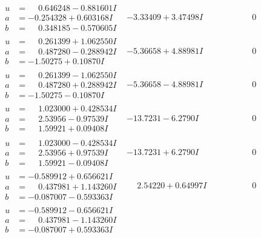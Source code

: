 \documentclass[1p]{elsarticle_modified}
\theoremstyle{definition}
\begin{document}
$$\begin{array}{c|c|c}
\begin{aligned}
u &= \phantom{-}0.646248 - 0.881601 I \\
a &= -0.254328 + 0.603168 I \\
b &= \phantom{-}0.348185 - 0.570605 I\end{aligned}
 & -3.33409 + 3.47498 I & \phantom{-0.000000 } 0 \\ \hline\begin{aligned}
u &= \phantom{-}0.261399 + 1.062550 I \\
a &= \phantom{-}0.487280 - 0.288942 I \\
b &= -1.50275 + 0.10870 I\end{aligned}
 & -5.36658 + 4.88981 I & \phantom{-0.000000 } 0 \\ \hline\begin{aligned}
u &= \phantom{-}0.261399 - 1.062550 I \\
a &= \phantom{-}0.487280 + 0.288942 I \\
b &= -1.50275 - 0.10870 I\end{aligned}
 & -5.36658 - 4.88981 I & \phantom{-0.000000 } 0 \\ \hline\begin{aligned}
u &= \phantom{-}1.023000 + 0.428534 I \\
a &= \phantom{-}2.53956 - 0.97539 I \\
b &= \phantom{-}1.59921 + 0.09408 I\end{aligned}
 & -13.7231 - 6.2790 I & \phantom{-0.000000 } 0 \\ \hline\begin{aligned}
u &= \phantom{-}1.023000 - 0.428534 I \\
a &= \phantom{-}2.53956 + 0.97539 I \\
b &= \phantom{-}1.59921 - 0.09408 I\end{aligned}
 & -13.7231 + 6.2790 I & \phantom{-0.000000 } 0 \\ \hline\begin{aligned}
u &= -0.589912 + 0.656621 I \\
a &= \phantom{-}0.437981 + 1.143260 I \\
b &= -0.087007 - 0.593363 I\end{aligned}
 & \phantom{-}2.54220 + 0.64997 I & \phantom{-0.000000 } 0 \\ \hline\begin{aligned}
u &= -0.589912 - 0.656621 I \\
a &= \phantom{-}0.437981 - 1.143260 I \\
b &= -0.087007 + 0.593363 I\end{aligned}

\end{array}$$
\end{document}
